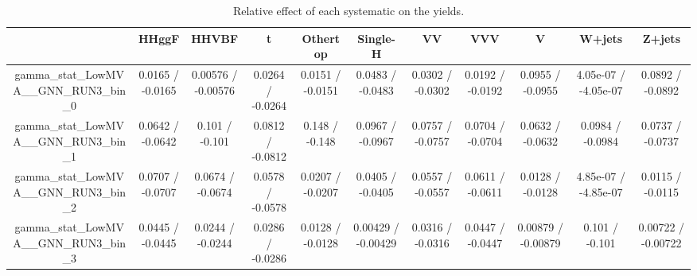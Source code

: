 \documentclass[10pt]{article}
\begin{document}
\begin{table}[htbp]
\begin{center}
\begin{tabular}{|c|c|c|c|c|c|c|c|c|c|c|}
\hline 
      & HHggF      & HHVBF      & t      & Othertop      & Single-H      & VV      & VVV      & V      & W+jets      & Z+jets \\ 
\hline 
  gamma_stat_LowMVA__GNN_RUN3_bin_0 & 0.0165 / -0.0165 & 0.00576 / -0.00576 & 0.0264 / -0.0264 & 0.0151 / -0.0151 & 0.0483 / -0.0483 & 0.0302 / -0.0302 & 0.0192 / -0.0192 & 0.0955 / -0.0955 & 4.05e-07 / -4.05e-07 & 0.0892 / -0.0892 \\ 
  gamma_stat_LowMVA__GNN_RUN3_bin_1 & 0.0642 / -0.0642 & 0.101 / -0.101 & 0.0812 / -0.0812 & 0.148 / -0.148 & 0.0967 / -0.0967 & 0.0757 / -0.0757 & 0.0704 / -0.0704 & 0.0632 / -0.0632 & 0.0984 / -0.0984 & 0.0737 / -0.0737 \\ 
  gamma_stat_LowMVA__GNN_RUN3_bin_2 & 0.0707 / -0.0707 & 0.0674 / -0.0674 & 0.0578 / -0.0578 & 0.0207 / -0.0207 & 0.0405 / -0.0405 & 0.0557 / -0.0557 & 0.0611 / -0.0611 & 0.0128 / -0.0128 & 4.85e-07 / -4.85e-07 & 0.0115 / -0.0115 \\ 
  gamma_stat_LowMVA__GNN_RUN3_bin_3 & 0.0445 / -0.0445 & 0.0244 / -0.0244 & 0.0286 / -0.0286 & 0.0128 / -0.0128 & 0.00429 / -0.00429 & 0.0316 / -0.0316 & 0.0447 / -0.0447 & 0.00879 / -0.00879 & 0.101 / -0.101 & 0.00722 / -0.00722 \\ 
\hline 
\end{tabular} 
\caption{Relative effect of each systematic on the yields.} 
\end{center} 
\end{table} 
\end{document}
